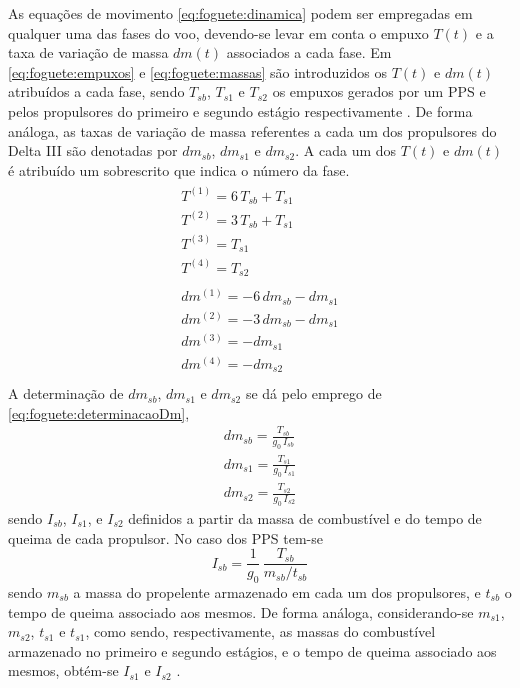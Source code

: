 As equações de movimento  \eqref{eq:foguete:dinamica} podem ser empregadas em qualquer uma das fases do voo, devendo-se levar em conta o empuxo $ T(t) $ e a taxa de variação de massa $ dm(t) $ associados a cada fase. Em \eqref{eq:foguete:empuxos} e \eqref{eq:foguete:massas} são introduzidos os $ T(t) $ e $ dm(t) $ atribuídos a cada fase, sendo $ T_{sb} $, $ T_{s1} $ e $ T_{s2} $ os empuxos gerados por um PPS e pelos propulsores do primeiro e segundo estágio respectivamente \cite{becerra_psopt_2019}. De forma análoga, as taxas de variação de massa referentes a cada um dos propulsores do Delta III são denotadas por $ dm_{sb} $, $ dm_{s1} $ e $ dm_{s2} $. A cada um dos $ T(t) $ e $ dm(t) $ é atribuído um sobrescrito que indica o número da fase. 
%
\begin{gather}
	\label{eq:foguete:empuxos}
	\begin{gathered}
		T^{(1)} = 6 \, T_{sb} + T_{s1} \\
		T^{(2)} = 3 \, T_{sb} + T_{s1} \\
		T^{(3)} = T_{s1} \\
		T^{(4)} = T_{s2}
	\end{gathered} \\
	\label{eq:foguete:massas}
	\begin{gathered}
		dm^{(1)} = -6 \, dm_{sb} - dm_{s1} \\
		dm^{(2)} = -3 \, dm_{sb} - dm_{s1} \\
		dm^{(3)} = - dm_{s1} \\
		dm^{(4)} = - dm_{s2} \\
	\end{gathered} 
\end{gather}
%
A determinação de $ dm_{sb} $, $ dm_{s1} $ e $ dm_{s2} $ se dá pelo emprego de  \eqref{eq:foguete:determinacaoDm},
%
\begin{equation}
	\label{eq:foguete:determinacaoDm}
	\begin{gathered}
		dm_{sb} = \frac{T_{sb}}{g_0 \, I_{sb}} \\
		dm_{s1} = \frac{T_{s1}}{g_0 \, I_{s1}} \\
		dm_{s2} = \frac{T_{s2}}{g_0 \, I_{s2}}
	\end{gathered}
\end{equation}
% 
sendo $ I_{sb} $, $ I_{s1} $, e $ I_{s2} $ definidos a partir da massa de combustível e do tempo de queima de cada propulsor. No caso dos PPS tem-se
%
\begin{equation}
I_{sb} = \frac{1}{g_0} \, \frac{T_{sb}}{m_{sb}/t_{sb}}
\end{equation}
%
sendo $ m_{sb} $ a massa do propelente armazenado em cada um dos propulsores, e $ t_{sb} $ o tempo de queima associado aos mesmos. De forma análoga, considerando-se $ m_{s1} $, $ m_{s2} $, $ t_{s1} $ e $ t_{s1} $, como sendo, respectivamente, as massas do combustível armazenado no primeiro e segundo estágios, e o tempo de queima associado aos mesmos, obtém-se $ I_{s1} $ e $ I_{s2} $ \cite{becerra_psopt_2019}.

